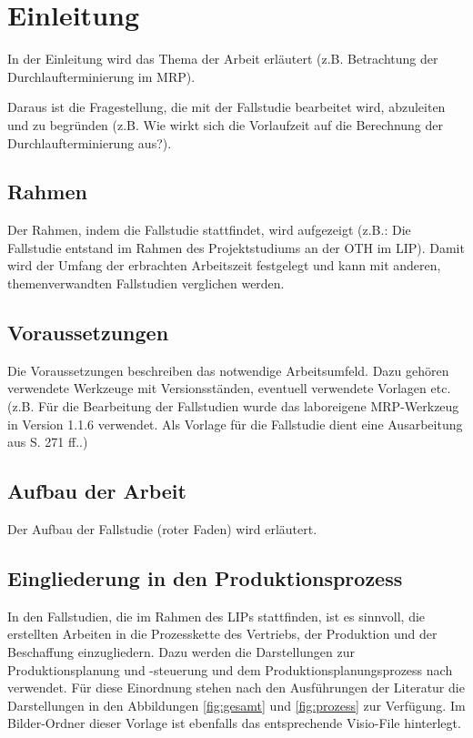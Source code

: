 \pagebreak

\section{Einleitung}
\label{ch:einleitung}
In der Einleitung wird das Thema der Arbeit erläutert (z.B. Betrachtung der Durchlaufterminierung im \gls{MRP}).

Daraus ist die Fragestellung, die mit der Fallstudie bearbeitet wird, abzuleiten und zu begründen (z.B. Wie wirkt sich die Vorlaufzeit auf die Berechnung der Durchlaufterminierung aus?).

		\subsection{Rahmen}
		\label{ch:rahmen}
		Der Rahmen, indem die Fallstudie stattfindet, wird aufgezeigt (z.B.: Die Fallstudie entstand im Rahmen des Projektstudiums an der \gls{OTH} im \gls{LIP}). Damit wird der Umfang der erbrachten Arbeitszeit festgelegt und kann mit anderen, themenverwandten Fallstudien verglichen werden.

		\subsection{Voraussetzungen}
		\label{ch:vorraussetzungen}
		Die Voraussetzungen beschreiben das notwendige Arbeitsumfeld. Dazu gehören verwendete Werkzeuge mit Versionsständen, eventuell verwendete Vorlagen etc. (z.B. Für die Bearbeitung der Fallstudien wurde das laboreigene MRP-Werkzeug in Version 1.1.6 verwendet. Als Vorlage für die Fallstudie dient eine Ausarbeitung aus \cite{Herrmann.2009} S. 271 ff..)

		\subsection{Aufbau der Arbeit}
		\label{ch:Aufbau}
		Der Aufbau der Fallstudie (roter Faden) wird erläutert.

		\subsection{Eingliederung in den Produktionsprozess}
		In den Fallstudien, die im Rahmen des LIPs stattfinden, ist es sinnvoll, die erstellten Arbeiten in die Prozesskette des Vertriebs, der Produktion und der Beschaffung einzugliedern. Dazu werden die Darstellungen zur Produktionsplanung und -steuerung und dem Produktionsplanungsprozess nach \cite{Herrmann.2011} verwendet. Für diese Einordnung stehen nach den Ausführungen der Literatur die Darstellungen in den Abbildungen \ref{fig:gesamt} und \ref{fig:prozess} zur Verfügung. Im Bilder-Ordner dieser Vorlage ist ebenfalls das entsprechende Visio-File hinterlegt.

